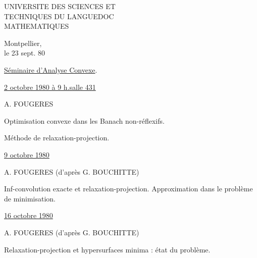 

UNIVERSITE DES SCIENCES ET\\
TECHNIQUES DU LANGUEDOC\\
MATHEMATIQUES

Montpellier,\\
le 23 sept. 80

\uline{Séminaire d'Analyse Convexe}.

\uline{2 octobre 1980 à 9 h.salle 431}

A. FOUGERES

Optimisation convexe dans les Banach non-réflexifs.

Méthode de relaxation-projection.

\uline{9 octobre 1980}

A. FOUGERES (d'après G. BOUCHITTE)

Inf-convolution exacte et relaxation-projection. Approximation dans le problème de minimisation.

\uline{16 octobre 1980}

A. FOUGERES (d'après G. BOUCHITTE)

Relaxation-projection et hypersurfaces minima : état du problème.



